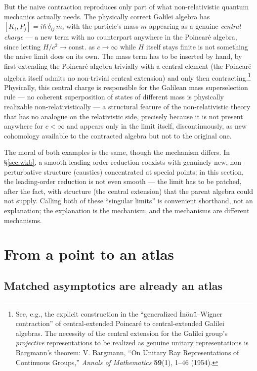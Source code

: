 But the naive contraction reproduces only part of what non-relativistic quantum
mechanics actually needs. The physically correct Galilei algebra has $[K_i,P_j]
= i\hbar\,\delta_{ij}\,m$, with the particle's mass $m$ appearing as a genuine
\emph{central charge} --- a new term with no counterpart anywhere in the
Poincar\'e algebra, since letting $H/c^2 \to \text{const.}$ as $c\to\infty$
while $H$ itself stays finite is not something the naive limit does on its own.
The mass term has to be inserted by hand, by first extending the Poincar\'e
algebra trivially with a central element (the Poincar\'e algebra itself admits
no non-trivial central extension) and only then contracting.\footnote{See,
e.g., the explicit construction in the ``generalized \.{I}n\"on\"u--Wigner
contraction'' of central-extended Poincar\'e to central-extended Galilei
algebras. The necessity of the central extension for the Galilei group's
\emph{projective} representations to be realized as genuine unitary
representations is Bargmann's theorem: V. Bargmann, ``On Unitary Ray
Representations of Continuous Groups,'' \emph{Annals of Mathematics}
\textbf{59}(1), 1--46 (1954).} Physically, this central charge is responsible
for the Galilean mass superselection rule --- no coherent superposition of
states of different mass is physically realizable non-relativistically --- a
structural feature of the non-relativistic theory that has no analogue on the
relativistic side, precisely because it is not present anywhere for $c<\infty$
and appears only in the limit itself, discontinuously, as new cohomology
available to the contracted algebra but not to the original one.

The moral of both examples is the same, though the mechanism differs. In
\S\ref{sec:wkb}, a smooth leading-order reduction coexists with genuinely new,
non-perturbative structure (caustics) concentrated at special points; in this
section, the leading-order reduction is not even smooth --- the limit has to be
patched, after the fact, with structure (the central extension) that the parent
algebra could not supply. Calling both of these ``singular limits'' is
convenient shorthand, not an explanation; the explanation is the mechanism, and
the mechanisms are different mechanisms.

\section{From a point to an atlas}

\subsection{Matched asymptotics are already an atlas}

